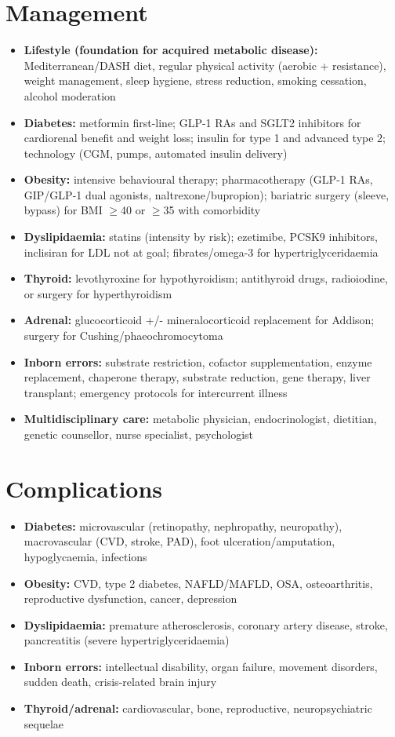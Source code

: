 \section*{Management}
\begin{itemize}
    \item \textbf{Lifestyle (foundation for acquired metabolic disease):} Mediterranean/DASH diet, regular physical activity (aerobic + resistance), weight management, sleep hygiene, stress reduction, smoking cessation, alcohol moderation
    \item \textbf{Diabetes:} metformin first-line; GLP-1 RAs and SGLT2 inhibitors for cardiorenal benefit and weight loss; insulin for type 1 and advanced type 2; technology (CGM, pumps, automated insulin delivery)
    \item \textbf{Obesity:} intensive behavioural therapy; pharmacotherapy (GLP-1 RAs, GIP/GLP-1 dual agonists, naltrexone/bupropion); bariatric surgery (sleeve, bypass) for BMI $\ge$40 or $\ge$35 with comorbidity
    \item \textbf{Dyslipidaemia:} statins (intensity by risk); ezetimibe, PCSK9 inhibitors, inclisiran for LDL not at goal; fibrates/omega-3 for hypertriglyceridaemia
    \item \textbf{Thyroid:} levothyroxine for hypothyroidism; antithyroid drugs, radioiodine, or surgery for hyperthyroidism
    \item \textbf{Adrenal:} glucocorticoid +/- mineralocorticoid replacement for Addison; surgery for Cushing/phaeochromocytoma
    \item \textbf{Inborn errors:} substrate restriction, cofactor supplementation, enzyme replacement, chaperone therapy, substrate reduction, gene therapy, liver transplant; emergency protocols for intercurrent illness
    \item \textbf{Multidisciplinary care:} metabolic physician, endocrinologist, dietitian, genetic counsellor, nurse specialist, psychologist
\end{itemize}

\section*{Complications}
\begin{itemize}
    \item \textbf{Diabetes:} microvascular (retinopathy, nephropathy, neuropathy), macrovascular (CVD, stroke, PAD), foot ulceration/amputation, hypoglycaemia, infections
    \item \textbf{Obesity:} CVD, type 2 diabetes, NAFLD/MAFLD, OSA, osteoarthritis, reproductive dysfunction, cancer, depression
    \item \textbf{Dyslipidaemia:} premature atherosclerosis, coronary artery disease, stroke, pancreatitis (severe hypertriglyceridaemia)
    \item \textbf{Inborn errors:} intellectual disability, organ failure, movement disorders, sudden death, crisis-related brain injury
    \item \textbf{Thyroid/adrenal:} cardiovascular, bone, reproductive, neuropsychiatric sequelae
\end{itemize}

